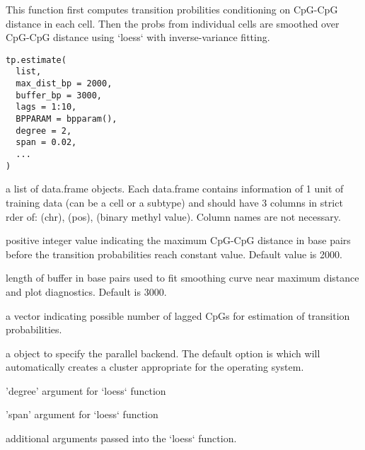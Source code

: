 \documentclass[letterpaper]{book}
\begin{document}
%
\begin{Description}
This function first computes transition probilities
conditioning on CpG-CpG distance in each cell. Then the probs from
individual cells are smoothed over CpG-CpG distance using `loess`
with inverse-variance fitting.
\end{Description}
%
\begin{Usage}
\begin{verbatim}
tp.estimate(
  list,
  max_dist_bp = 2000,
  buffer_bp = 3000,
  lags = 1:10,
  BPPARAM = bpparam(),
  degree = 2,
  span = 0.02,
  ...
)
\end{verbatim}
\end{Usage}
%
\begin{Arguments}
\begin{ldescription}
\item[\code{list}] a list of data.frame objects. Each data.frame
contains information of 1 unit of training data (can be a cell or a
subtype) and should have 3 columns in strict rder of: (chr), (pos),
(binary methyl value). Column names are not necessary.

\item[\code{max\_dist\_bp}] positive integer value indicating the maximum
CpG-CpG distance in base pairs before the transition probabilities
reach constant value. Default value is 2000.

\item[\code{buffer\_bp}] length of buffer in base pairs used to fit smoothing
curve near maximum distance and plot diagnostics. Default is 3000.

\item[\code{lags}] a vector indicating possible number of lagged CpGs for
estimation of transition probabilities.

\item[\code{BPPARAM}] a  object to specify the parallel
backend. The default option is  which will
automatically creates a cluster appropriate for the operating system.

\item[\code{degree}] 'degree' argument for `loess` function

\item[\code{span}] 'span' argument for `loess` function

\item[\code{...}] additional arguments passed into the `loess` function.
\end{ldescription}
\end{Arguments}
\end{document}
